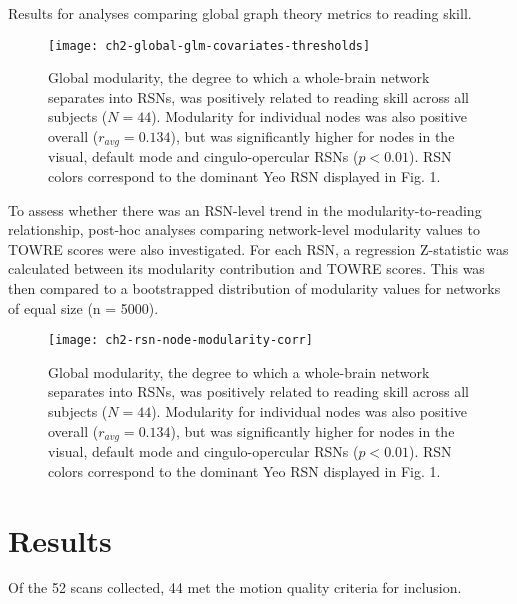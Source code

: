 \begin{table}
    \renewcommand{\tabcolsep}{0.09cm}
    \centering
    
    \caption{Results for analyses comparing global graph theory metrics to reading skill.}
    \label{table:ch2-global-glm-results}
\end{table}

\begin{figure}[t]
    \centering
    \texttt{[image: ch2-global-glm-covariates-thresholds]}
    \caption[Modularity metrics at rest are the best predictors of cognitive skills.] {Global modularity, the degree to which a whole-brain network separates into RSNs, was positively related to reading skill across all subjects ($N = 44$). Modularity for individual nodes was also positive overall ($r_{avg} = 0.134$), but was significantly higher for nodes in the visual, default mode and cingulo-opercular RSNs ($p < 0.01$). RSN colors correspond to the dominant Yeo RSN displayed in Fig. 1.}
    \label{fig:ch2-global-glm-covariates-thresh}
\end{figure}

To assess whether there was an RSN-level trend in the modularity-to-reading relationship, post-hoc analyses comparing network-level modularity values to TOWRE scores were also investigated. For each RSN, a regression Z-statistic was calculated between its modularity contribution and TOWRE scores. This was then compared to a bootstrapped distribution of modularity values for networks of equal size (n = 5000). 

\begin{figure}[t]
    \centering
    \texttt{[image: ch2-rsn-node-modularity-corr]}
    \caption[Modularity metrics at rest predict reading skill.] {Global modularity, the degree to which a whole-brain network separates into RSNs, was positively related to reading skill across all subjects ($N = 44$). Modularity for individual nodes was also positive overall ($r_{avg} = 0.134$), but was significantly higher for nodes in the visual, default mode and cingulo-opercular RSNs ($p < 0.01$). RSN colors correspond to the dominant Yeo RSN displayed in Fig. 1.}
    \label{fig:ch2-rsn-node-modularity-corr}
\end{figure}

\section{Results} 

Of the 52 scans collected, 44 met the motion quality criteria for inclusion. 

